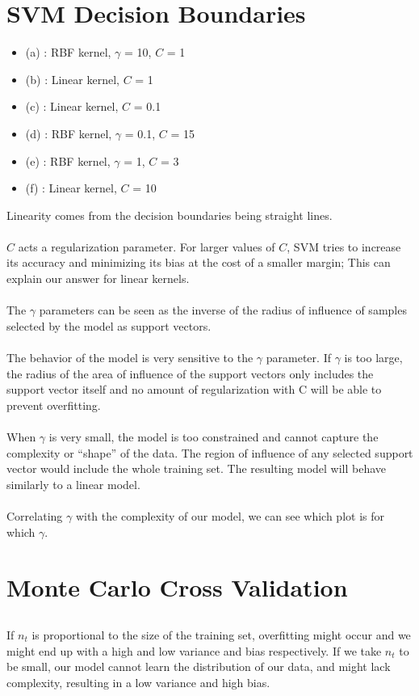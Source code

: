 \documentclass[12pt,onecolumn,a4paper]{article}
\begin{document}
\section{SVM Decision Boundaries}
\begin{itemize}
	\item (a) : RBF kernel, $\gamma$ = 10, $C$ = 1
	\item (b) : Linear kernel, $C$ = 1
	\item (c) : Linear kernel, $C$ = 0.1
	\item (d) : RBF kernel, $\gamma$ = 0.1, $C$ = 15
	\item (e) : RBF kernel, $\gamma$ = 1, $C$ = 3
	\item (f) : Linear kernel, $C$ = 10
\end{itemize}
Linearity comes from the decision boundaries being straight lines.
\\ \\
$C$ acts a regularization parameter. For larger values of $C$, SVM tries to increase its accuracy and minimizing its bias at the cost of a smaller margin; This can explain our answer for linear kernels. 
\\ \\
The $\gamma$ parameters can be seen as the inverse of the radius of influence of samples selected by the model as support vectors.
\\ \\
The behavior of the model is very sensitive to the $\gamma$ parameter. If $\gamma$ is too large, the radius of the area of influence of the support vectors only includes the support vector itself and no amount of regularization with C will be able to prevent overfitting.
\\ \\
When $\gamma$ is very small, the model is too constrained and cannot capture the complexity or “shape” of the data. The region of influence of any selected support vector would include the whole training set. The resulting model will behave similarly to a linear model.
\\ \\
Correlating $\gamma$ with the complexity of our model, we can see which plot is for which $\gamma$.
\section{Monte Carlo Cross Validation}
\subsection{}
If $n_t$ is proportional to the size of the training set, overfitting might occur and we might end up with a high and low variance and bias respectively. If we take $n_t$ to be small, our model cannot learn the distribution of our data, and might lack complexity, resulting in a low variance and high bias. 
\end{document}
